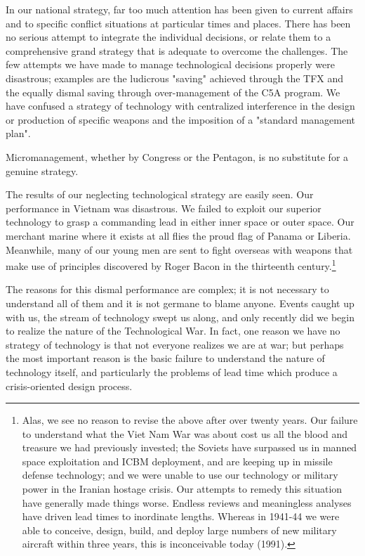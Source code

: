 \documentclass[a4paper,12pt]{book}
\begin{document}
In our national strategy, far too much attention has been given to current affairs and to specific conflict situations at particular times and places. There has been no serious attempt to integrate the individual decisions, or relate them to a comprehensive grand strategy that is adequate to overcome the challenges. The few attempts we have made to manage technological decisions properly were disastrous; examples are the ludicrous "saving" achieved through the TFX and the equally dismal saving through over-management of the C5A program. We have confused a strategy of technology with centralized interference in the design or production of specific weapons and the imposition of a "standard management plan".

Micromanagement, whether by Congress or the Pentagon, is no substitute for a genuine strategy.

The results of our neglecting technological strategy are easily seen. Our performance in Vietnam was disastrous. We failed to exploit our superior technology to grasp a commanding lead in either inner space or outer space. Our merchant marine where it exists at all flies the proud flag of Panama or Liberia. Meanwhile, many of our young men are sent to fight overseas with weapons that make use of principles discovered by Roger Bacon in the thirteenth century.\footnote{
Alas, we see no reason to revise the above after over twenty years. Our failure to understand what the Viet Nam War was about cost us all the blood and treasure we had previously invested; the Soviets have surpassed us in manned space exploitation and ICBM deployment, and are keeping up in missile defense technology; and we were unable to use our technology or military power in the Iranian hostage crisis.
Our attempts to remedy this situation have generally made things worse. Endless reviews and meaningless analyses have driven lead times to inordinate lengths. Whereas in 1941-44 we were able to conceive, design, build, and deploy large numbers of new military aircraft within three years, this is inconceivable today (1991).}

The reasons for this dismal performance are complex; it is not necessary to understand all of them and it is not germane to blame anyone. Events caught up with us, the stream of technology swept us along, and only recently did we begin to realize the nature of the Technological War. In fact, one reason we have no strategy of technology is that not everyone realizes we are at war; but perhaps the most important reason is the basic failure to understand the nature of technology itself, and particularly the problems of lead time which produce a crisis-oriented design process.
\end{document}
